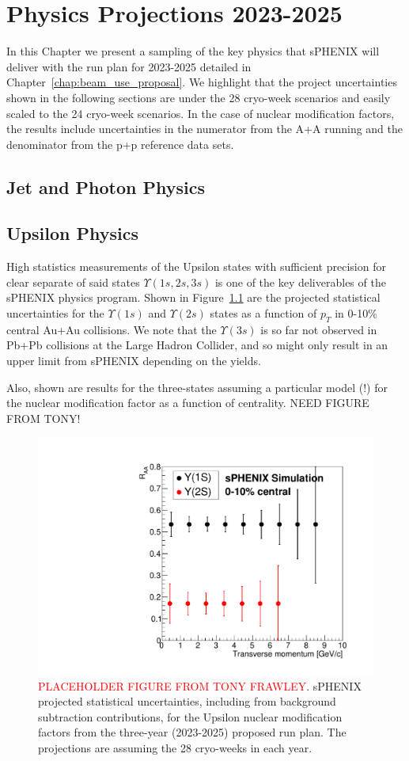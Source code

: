 \chapter{Physics Projections 2023-2025}
\label{chap:physics_projections}

In this Chapter we present a sampling of the key physics that sPHENIX will deliver with the run plan for 2023-2025 detailed in Chapter~\ref{chap:beam_use_proposal}.    We highlight that the project uncertainties shown in the following sections are under the 28 cryo-week scenarios and easily scaled to the 24 cryo-week scenarios.  In the case of nuclear modification factors, the results include uncertainties in the numerator from the A+A running and the denominator from the p+p reference data sets.

\section{Jet and Photon Physics}
\label{sec:jet}

\section{Upsilon Physics}
\label{sec:upsilon}

High statistics measurements of the Upsilon states with sufficient precision for clear separate of said states $\Upsilon(1s,2s,3s)$ is one of the key deliverables of the sPHENIX physics program.  Shown in Figure~\ref{fig:upsilon3years} are the projected statistical uncertainties for the $\Upsilon(1s)$ and $\Upsilon(2s)$ states as a function of $p_{T}$ in 0-10\% central Au+Au collisions.   We note that the $\Upsilon(3s)$ is so far not observed in Pb+Pb collisions at the Large Hadron Collider, and so might only result in an upper limit from sPHENIX depending on the yields.   

Also, shown are results for the three-states assuming a particular model (!) for the nuclear modification factor as a function of centrality.   NEED FIGURE FROM TONY!

\begin{figure}
    \centering
    \includegraphics[width=0.55\linewidth]{figs/BUP_Upsilon_RAA_3yr_28wks.pdf}
    \caption{{\textcolor{red}{PLACEHOLDER FIGURE FROM TONY FRAWLEY}}. sPHENIX projected statistical uncertainties, including from background subtraction contributions, for the Upsilon nuclear modification factors from the three-year (2023-2025) proposed run plan.   The projections are assuming the 28 cryo-weeks in each year.
    \label{fig:upsilon3years}}
\end{figure}

